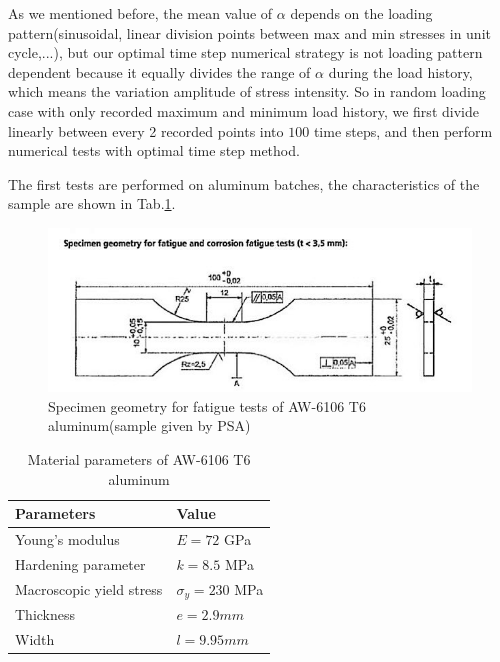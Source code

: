 As we mentioned before, the mean value of $\alpha$ depends on the loading pattern(sinusoidal, linear division points between max and min stresses in unit cycle,...), but our optimal time step numerical strategy is not loading pattern dependent because it equally divides the range of $\alpha$ during the load history, which means the variation amplitude of stress intensity. So in random loading case with only recorded maximum and minimum load history, we first divide linearly between every 2 recorded points into $100$ time steps, and then perform numerical tests with optimal time step method.

The first tests are performed on aluminum batches, the characteristics of the sample are shown in Tab.\ref{tab:cetim}.
\begin{figure}[!h]
\centering
\includegraphics[width=\textwidth]{figures//aluminum_cetim.png} 
\caption{Specimen geometry for fatigue tests of AW-6106 T6 aluminum(sample given by PSA)}
\label{fig:aluminum}
\end{figure}
\begin{table}[!h]
\centering
\begin{tabular}{ll}
\hline
\textbf{Parameters}                                         & \textbf{Value}                    \\ \hline
Young's modulus                                             & $E=72$ GPa                       \\
Hardening parameter                                         &  $k=8.5$ MPa \\
Macroscopic yield stress                                    & $\sigma_y=230$ MPa              \\
Thickness & $e=2.9mm$                        \\
Width		 & $l= 9.95mm$                        \\ \hline
\end{tabular}
\caption{Material parameters of AW-6106 T6 aluminum}
\label{tab:cetim}
\end{table}

